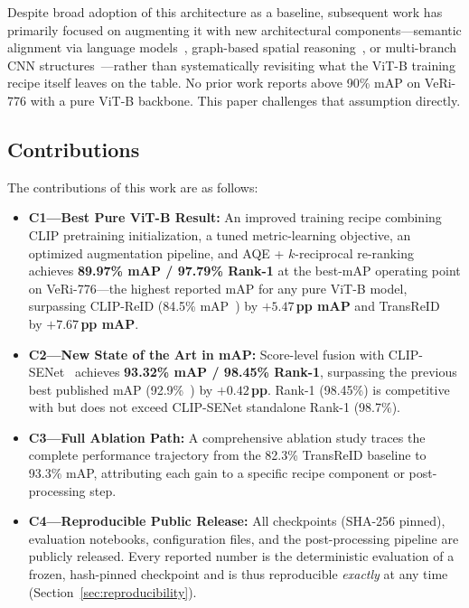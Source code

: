 \documentclass[11pt]{article}
\begin{document}
Despite broad adoption of this architecture as a baseline, subsequent work has
primarily focused on augmenting it with new architectural
components---semantic alignment via language
models~\cite{li2023clipreid,lu2025clipsenet}, graph-based spatial
reasoning~\cite{shen2022hpgn}, or multi-branch CNN
structures~\cite{luo2023mbr4b}---rather than systematically revisiting what
the ViT-B training recipe itself leaves on the table. No prior work reports
above 90\% mAP on VeRi-776 with a pure ViT-B backbone. This paper challenges
that assumption directly.

\subsection{Contributions}
The contributions of this work are as follows:
\begin{itemize}
  \item \textbf{C1---Best Pure ViT-B Result:} An improved training recipe
    combining CLIP pretraining initialization, a tuned metric-learning
    objective, an optimized augmentation pipeline, and AQE + $k$-reciprocal
    re-ranking~\cite{zhong2017rerank} achieves \textbf{89.97\%
    mAP / 97.79\% Rank-1} at the best-mAP operating point on VeRi-776---the
    highest reported mAP for any pure ViT-B model, surpassing CLIP-ReID (84.5\%
    mAP~\cite{li2023clipreid}) by $\mathbf{+5.47}$\,\textbf{pp mAP} and
    TransReID~\cite{he2021transreid} by $\mathbf{+7.67}$\,\textbf{pp mAP}.
  \item \textbf{C2---New State of the Art in mAP:} Score-level fusion with
    CLIP-SENet~\cite{lu2025clipsenet} achieves \textbf{93.32\% mAP /
    98.45\% Rank-1}, surpassing the previous best published mAP
    (92.9\%~\cite{lu2025clipsenet}) by $\mathbf{+0.42}$\,\textbf{pp}.
    Rank-1 (98.45\%) is competitive with but does not exceed CLIP-SENet
    standalone Rank-1 (98.7\%).
  \item \textbf{C3---Full Ablation Path:} A comprehensive ablation study
    traces the complete performance trajectory from the 82.3\% TransReID
    baseline to 93.3\% mAP, attributing each gain to a specific recipe
    component or post-processing step.
  \item \textbf{C4---Reproducible Public Release:} All checkpoints (SHA-256
    pinned), evaluation notebooks, configuration files, and the
    post-processing pipeline are publicly released. Every reported number is
    the deterministic evaluation of a frozen, hash-pinned checkpoint and is
    thus reproducible \emph{exactly} at any time
    (Section~\ref{sec:reproducibility}).
\end{itemize}
\end{document}
